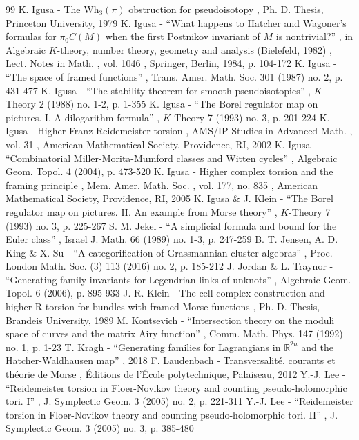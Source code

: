 \documentclass[11pt]{article}
\numberwithin{equation}{section}\providecommand{\dpl}{\displaystyle}
\begin{document}
\begin{thebibliography}{99}
 K. Igusa - The $\mathrm{Wh}_3(\pi )$ obstruction for pseudoisotopy , Ph. D. Thesis, Princeton University, 1979
 K. Igusa - “What happens to Hatcher and Wagoner’s formulas for $\pi _{0}C(M)$ when the first Postnikov invariant of $M$ is nontrivial?” , in Algebraic $K$-theory, number theory, geometry and analysis (Bielefeld, 1982) , Lect. Notes in Math. , vol. 1046 , Springer, Berlin, 1984, p. 104-172
 K. Igusa - “The space of framed functions” , Trans. Amer. Math. Soc. 301 (1987) no. 2, p. 431-477
 K. Igusa - “The stability theorem for smooth pseudoisotopies” , $K$-Theory 2 (1988) no. 1-2, p. 1-355
 K. Igusa - “The Borel regulator map on pictures. I. A dilogarithm formula” , $K$-Theory 7 (1993) no. 3, p. 201-224
 K. Igusa - Higher Franz-Reidemeister torsion , AMS/IP Studies in Advanced Math. , vol. 31 , American Mathematical Society, Providence, RI, 2002
 K. Igusa - “Combinatorial Miller-Morita-Mumford classes and Witten cycles” , Algebraic Geom. Topol. 4 (2004), p. 473-520
 K. Igusa - Higher complex torsion and the framing principle , Mem. Amer. Math. Soc. , vol. 177, no. 835 , American Mathematical Society, Providence, RI, 2005
 K. Igusa \& J. Klein - “The Borel regulator map on pictures. II. An example from Morse theory” , $K$-Theory 7 (1993) no. 3, p. 225-267
 S. M. Jekel - “A simplicial formula and bound for the Euler class” , Israel J. Math. 66 (1989) no. 1-3, p. 247-259
 B. T. Jensen, A. D. King \& X. Su - “A categorification of Grassmannian cluster algebras” , Proc. London Math. Soc. (3) 113 (2016) no. 2, p. 185-212
 J. Jordan \& L. Traynor - “Generating family invariants for Legendrian links of unknots” , Algebraic Geom. Topol. 6 (2006), p. 895-933
 J. R. Klein - The cell complex construction and higher R-torsion for bundles with framed Morse functions , Ph. D. Thesis, Brandeis University, 1989
 M. Kontsevich - “Intersection theory on the moduli space of curves and the matrix Airy function” , Comm. Math. Phys. 147 (1992) no. 1, p. 1-23
 T. Kragh - “Generating families for Lagrangians in $\mathbb{R}^{2n}$ and the Hatcher-Waldhausen map” , 2018
 F. Laudenbach - Transversalité, courants et théorie de Morse , Éditions de l’École polytechnique, Palaiseau, 2012
 Y.-J. Lee - “Reidemeister torsion in Floer-Novikov theory and counting pseudo-holomorphic tori. I” , J. Symplectic Geom. 3 (2005) no. 2, p. 221-311
 Y.-J. Lee - “Reidemeister torsion in Floer-Novikov theory and counting pseudo-holomorphic tori. II” , J. Symplectic Geom. 3 (2005) no. 3, p. 385-480

\end{thebibliography}
\end{document}
